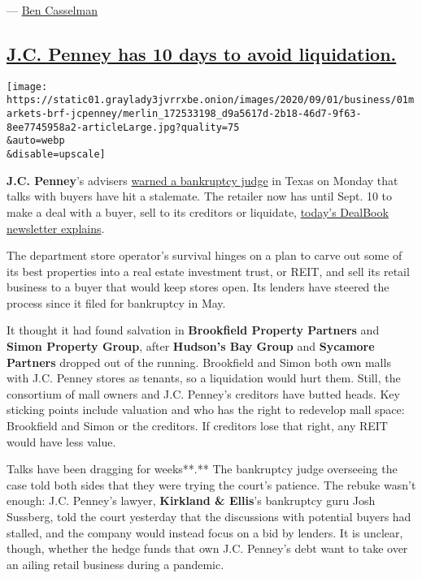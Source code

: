 --- \href{https://www.nytimes3xbfgragh.onion/by/ben-casselman}{Ben
Casselman}

\hypertarget{jc-penney-has-10-days-to-avoid-liquidation}{%
\subsection{\texorpdfstring{\protect\hyperlink{jc-penney-has-10-days-to-avoid-liquidation}{J.C.
Penney has 10 days to avoid
liquidation.}}{J.C. Penney has 10 days to avoid liquidation.}}\label{jc-penney-has-10-days-to-avoid-liquidation}}

\texttt{[image: https://static01.graylady3jvrrxbe.onion/images/2020/09/01/business/01markets-brf-jcpenney/merlin\_172533198\_d9a5617d-2b18-46d7-9f63-8ee7745958a2-articleLarge.jpg?quality=75\\\&auto=webp\\\&disable=upscale]}

\textbf{J.C. Penney}'s advisers
\href{https://www.nytimes3xbfgragh.onion/live/2020/08/31/business/stock-market-today-coronavirus/jc-penney-hits-stalemate-in-buyer-talks}{warned
a bankruptcy judge} in Texas on Monday that talks with buyers have hit a
stalemate. The retailer now has until Sept. 10 to make a deal with a
buyer, sell to its creditors or liquidate,
\href{https://www.nytimes3xbfgragh.onion/2020/09/01/business/dealbook/tiktok-trump-china-cold-war.html}{today's
DealBook newsletter explains}.

The department store operator's survival hinges on a plan to carve out
some of its best properties into a real estate investment trust, or
REIT, and sell its retail business to a buyer that would keep stores
open. Its lenders have steered the process since it filed for bankruptcy
in May.

It thought it had found salvation in \textbf{Brookfield Property
Partners} and \textbf{Simon Property Group}, after \textbf{Hudson's Bay
Group} and \textbf{Sycamore Partners} dropped out of the running.
Brookfield and Simon both own malls with J.C. Penney stores as tenants,
so a liquidation would hurt them. Still, the consortium of mall owners
and J.C. Penney's creditors have butted heads. Key sticking points
include valuation and who has the right to redevelop mall space:
Brookfield and Simon or the creditors. If creditors lose that right, any
REIT would have less value.

Talks have been dragging for weeks**.** The bankruptcy judge overseeing
the case told both sides that they were trying the court's patience. The
rebuke wasn't enough: J.C. Penney's lawyer, \textbf{Kirkland \& Ellis}'s
bankruptcy guru Josh Sussberg, told the court yesterday that the
discussions with potential buyers had stalled, and the company would
instead focus on a bid by lenders. It is unclear, though, whether the
hedge funds that own J.C. Penney's debt want to take over an ailing
retail business during a pandemic.


